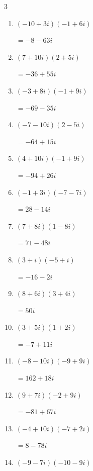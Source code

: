 \begin{multicols}{3}
\begin{enumerate}
  \item $\displaystyle (-10+3i)(-1+6i)$

        $\displaystyle =-8-63i$

  \item $\displaystyle (7+10i)(2+5i)$

        $\displaystyle =-36+55i$

  \item $\displaystyle (-3+8i)(-1+9i)$

        $\displaystyle =-69-35i$

  \item $\displaystyle (-7-10i)(2-5i)$

        $\displaystyle =-64+15i$

  \item $\displaystyle (4+10i)(-1+9i)$

        $\displaystyle =-94+26i$

  \item $\displaystyle (-1+3i)(-7-7i)$

        $\displaystyle =28-14i$

  \item $\displaystyle (7+8i)(1-8i)$

        $\displaystyle =71-48i$

  \item $\displaystyle (3+i)(-5+i)$

        $\displaystyle =-16-2i$

  \item $\displaystyle (8+6i)(3+4i)$

        $\displaystyle =50i$

\columnbreak %

  \item $\displaystyle (3+5i)(1+2i)$

        $\displaystyle =-7+11i$

  \item $\displaystyle (-8-10i)(-9+9i)$

        $\displaystyle =162+18i$

  \item $\displaystyle (9+7i)(-2+9i)$

        $\displaystyle =-81+67i$

  \item $\displaystyle (-4+10i)(-7+2i)$

        $\displaystyle =8-78i$

  \item $\displaystyle (-9-7i)(-10-9i)$


\end{enumerate}
\end{multicols}
